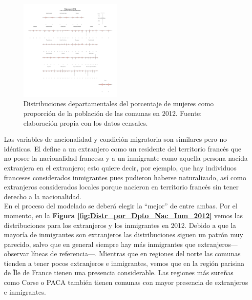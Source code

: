 \begin{figure}[h]
	\centering
	\includegraphics[width = 0.45\textwidth]{Figs/AED/Geofacet_Distr_por_Dpto_Muj_2012}
	\caption{Distribuciones departamentales del porcentaje de mujeres como proporción de la población de las comunas en 2012. Fuente: elaboración propia con los datos censales.}
	\label{fig:Distr_por_Dpto_Muj_2012}	
\end{figure}

Las variables de nacionalidad y condición migratoria son similares pero no idénticas. El \textcite{DefsCenso} define a un extranjero como un residente del territorio francés que no posee la nacionalidad francesa y a un inmigrante como aquella persona nacida extranjera en el extranjero; esto quiere decir, por ejemplo, que hay individuos franceses considerados inmigrantes pues pudieron haberse naturalizado, así como extranjeros considerados locales porque nacieron en territorio francés sin tener derecho a la nacionalidad.\\ 

En el proceso del modelado se deberá elegir la ``mejor'' de entre ambas. Por el momento, en la \textbf{Figura \ref{fig:Distr_por_Dpto_Nac_Inm_2012}} vemos las distribuciones para los extranjeros y los inmigrantes en 2012. Debido a que la mayoría de inmigrantes son extranjeros las distribuciones siguen un patrón muy parecido, salvo que en general siempre hay más inmigrantes que extranjeros--- observar líneas de referencia---. Mientras que en regiones del norte las comunas tienden a tener pocos extranjeros e inmigrantes, vemos que en la región parisina de Île de France tienen una presencia considerable. Las regiones más sureñas como Corse o PACA también tienen comunas con mayor presencia de extranjeros e inmigrantes.\\

